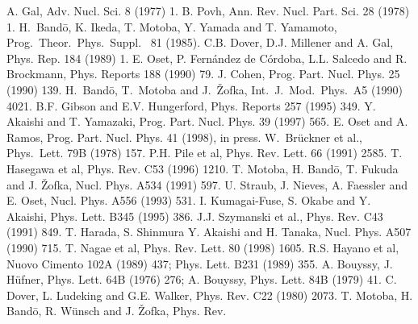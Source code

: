 \begin{references}
 A. Gal, Adv. Nucl. Sci. 8 (1977) 1.
 B. Povh, Ann. Rev. Nucl. Part. Sci. 28 (1978) 1.
H.\ Band\={o}, K. Ikeda, T. Motoba, Y. Yamada and T. Yamamoto, 
Prog.\ Theor.\ Phys.\ Suppl. \ 81 (1985). 
 C.B. Dover, D.J. Millener and A. Gal, Phys. 
Rep. 184 (1989) 1.
 E. Oset, P. Fern\'andez de C\'ordoba, L.L. Salcedo
and R. Brockmann, Phys. Reports 188 (1990) 79.
 J. Cohen, Prog. Part. Nucl. Phys. 25 (1990) 139.
 H.\ Band\={o}, T.\ Motoba and J.\ \v{Z}ofka, Int.\ J.\ Mod.\
Phys.\ A5 (1990) 4021.
 B.F. Gibson and E.V. Hungerford, Phys. Reports 257 (1995) 
349.
 Y. Akaishi and T. Yamazaki, Prog. Part. Nucl. Phys.
39 (1997) 565.
 E. Oset and A. Ramos, Prog. Part. Nucl. Phys. 41 (1998),
in press.
W.\ Br\"{u}ckner et al., Phys.\ Lett.  79B (1978) 157.
P.H. Pile et al, Phys. Rev. Lett. 66 (1991) 2585.
T. Hasegawa et al, Phys. Rev. C53 (1996) 1210.
T. Motoba, H. Band\={o}, T. Fukuda and J. \v{Z}ofka, Nucl. Phys. A534 
(1991) 597.
U. Straub, J. Nieves, A. Faessler and E. Oset, Nucl. Phys. A556
(1993) 531.
I. Kumagai-Fuse, S. Okabe and Y. Akaishi, Phys. Lett. B345 (1995) 386.
\bibitem{szyman91}
J.J. Szymanski et al., Phys. Rev. C43 (1991) 849.
T. Harada, S. Shinmura Y. Akaishi and H. Tanaka, Nucl. Phys. A507
(1990) 715.
T. Nagae et al, Phys. Rev. Lett. 80 (1998) 1605.
R.S. Hayano et al, Nuovo Cimento 102A (1989) 437; 
Phys. Lett. B231 (1989) 355.
A. Bouyssy, J. H\"{u}fner, Phys. Lett. 64B (1976) 276;
A. Bouyssy, Phys. Lett. 84B (1979) 41.
C. Dover, L. Ludeking and G.E. Walker, Phys. Rev. C22 (1980) 2073.
\bibitem{moto88}
T. Motoba, H. Band\={o}, R. W\"{u}nsch and J. \v{Z}ofka, Phys. Rev.

\end{references}
